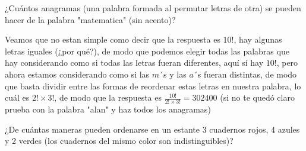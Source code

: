 \documentclass[11pt]{scrartcl}
\begin{document}
\begin{example}
    ¿Cuántos anagramas (una palabra formada al permutar letras de otra) se pueden hacer de la palabra "matematica" (sin acento)?
\end{example}
Veamos que no estan simple como decir que la respuesta es $10!$, hay algunas letras iguales (¿por qué?), de modo que podemos elegir todas las palabras que hay considerando como si todas las letras fueran diferentes, aquí sí hay $10!$, pero ahora estamos considerando  como si las $m$´s y las $a$´s fueran distintas, de modo que basta dividir entre las formas de reordenar estas letras en nuestra palabra, lo cuál es $2!\times 3!$, de modo que la respuesta es $\frac{10!}{2!\times 3!}=302400$ (si no te quedó claro prueba con la palabra "alan" y haz todos los anagramas)
\begin{example}\label{ejemplo_cuadernos}
    ¿De cuántas maneras pueden ordenarse en un
estante 3 cuadernos rojos, 4 azules y 2 verdes (los cuadernos del mismo color son indistinguibles)?
\end{example}
\end{document}
